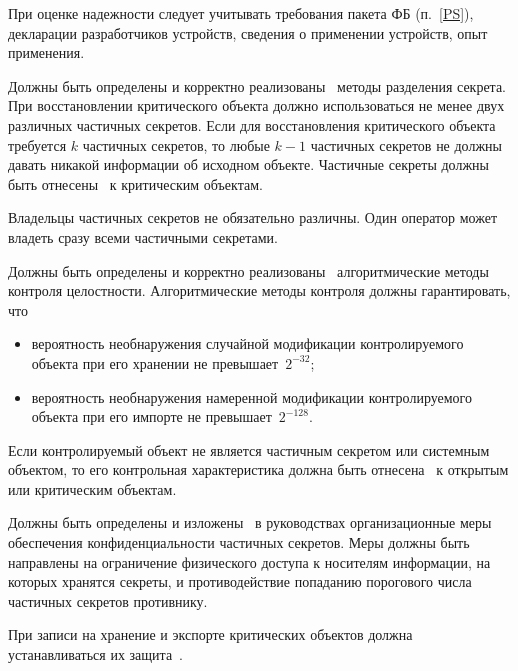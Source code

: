 \begin{note}
При оценке надежности следует учитывать требования пакета ФБ (п.~\ref{PS}),
декларации разработчиков устройств, сведения о применении устройств, опыт 
применения.
\end{note}

\label{R.DP.Split} %
Должны быть определены и корректно
реализованы~  методы разделения
секрета. При восстановлении критического объекта должно использоваться не менее
двух различных частичных секретов.
%
Если для восстановления критического объекта требуется $k$ частичных секретов,
то любые $k-1$ частичных секретов не должны давать никакой информации об 
исходном объекте.
%
Частичные секреты должны быть отнесены~ к критическим объектам.

\begin{note}
Владельцы частичных секретов не обязательно различны. 
Один оператор может владеть сразу всеми частичными секретами.
\end{note}

\label{R.DP.Algo} %
Должны быть определены и корректно 
реализованы~ алгоритмические методы 
контроля целостности.
%
Алгоритмические методы контроля должны гарантировать, что
\begin{itemize}
\item
вероятность необнаружения случайной модификации контролируемого 
объекта при его хранении не превышает~$2^{-32}$;
\item
вероятность необнаружения намеренной модификации контролируемого 
объекта при его импорте не превышает~$2^{-128}$.
\end{itemize}

Если контролируемый объект не является частичным секретом или системным
объектом, то его контрольная характеристика должна быть 
отнесена~ к открытым или критическим объектам.

\label{R.DP.Org} %
Должны быть определены и изложены~ 
в руководствах организационные меры обеспечения конфиденциальности 
частичных секретов. Меры должны быть направлены на ограничение физического 
доступа к носителям информации, на которых хранятся секреты, и 
противодействие попаданию порогового числа частичных секретов 
противнику. 

\label{R.DP.Export} %
При записи на хранение и экспорте критических объектов должна 
устанавливаться их защита~.

